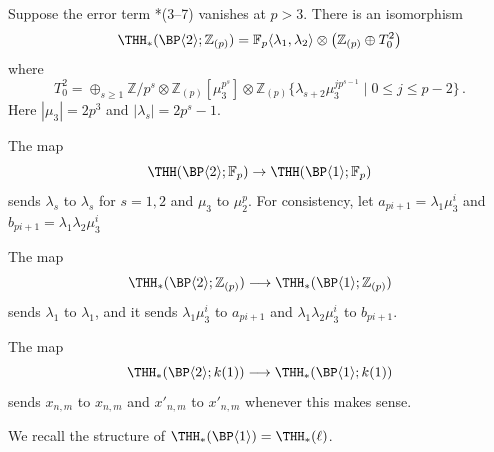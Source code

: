 \begin{theorem}\label{thm:BP2-coeff}
Suppose the error term \cite{ACH24}*{(3--7)} vanishes at $p>3$. There is an isomorphism 
\[ 
\THH_*(\BP\langle 2\rangle ;\mathbb{Z}_{(p)})=\mathbb{F}_p\langle \lambda_1 ,\lambda_2\rangle \otimes \left ( \mathbb{Z}_{(p)}\oplus T_0^2 \right )
\]
where 
\[ T_0^2 = \oplus_{s\ge 1} \mathbb{Z}/p^s\otimes \mathbb{Z}_{(p)}[\mu_3^{p^s}]\otimes \mathbb{Z}_{(p)}\{\lambda_{s+2}\mu_3^{jp^{s-1}} \mid 0\le j\le p-2 \} \,. 
\]
Here $|\mu_3|=2p^3$ and $|\lambda_{s}|=2p^{s}-1$. 
\end{theorem}

The map 
\[ 
  \THH(\BP\langle 2\rangle ; \mathbb{F}_p)\to  \THH(\BP\langle 1\rangle ; \mathbb{F}_p) 
\]
sends $\lambda_s$ to $\lambda_s$ for $s=1,2$ and $\mu_3$ to $\mu_2^p$. For consistency, let $a_{pi+1}=\lambda_1\mu_3^{i}$ and $b_{pi+1}=\lambda_1\lambda_2\mu_3^{i}$ 

\begin{corollary}
  The map 
  \[ 
    \THH_*(\BP\langle 2\rangle ;\mathbb{Z}_{(p)})\longrightarrow \THH_*(\BP\langle 1\rangle ;\mathbb{Z}_{(p)})
  \]
  sends $\lambda_1$ to $\lambda_1$, and it sends $\lambda_1\mu_3^i$ to $a_{pi+1}$ and $\lambda_1\lambda_2\mu_3^i$ to $b_{pi+1}$. 

  The map 
  \[ 
    \THH_*(\BP\langle 2\rangle ;k(1))\longrightarrow \THH_*(\BP\langle 1\rangle ;k(1))
  \]
  sends $x_{n,m}$ to $x_{n,m}$ and $x'_{n,m}$ to $x'_{n,m}$ whenever this makes sense.
\end{corollary}



We recall the structure of $\THH_*(\BP \langle 1 \rangle) = \THH_*(\ell)$.

